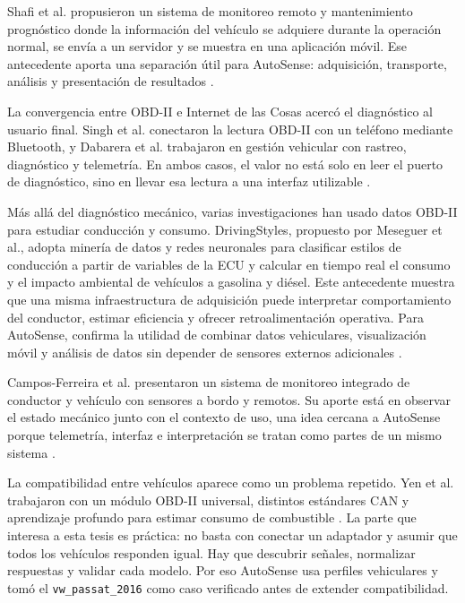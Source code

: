 \documentclass[12pt,letterpaper]{report}
\begin{document}
Shafi et al. propusieron un sistema de monitoreo remoto y mantenimiento prognóstico donde la información del vehículo se adquiere durante la operación normal, se envía a un servidor y se muestra en una aplicación móvil. Ese antecedente aporta una separación útil para AutoSense: adquisición, transporte, análisis y presentación de resultados \cite{shafi2018_vehicle_remote_health}.

La convergencia entre OBD-II e Internet de las Cosas acercó el diagnóstico al usuario final. Singh et al. conectaron la lectura OBD-II con un teléfono mediante Bluetooth, y Dabarera et al. trabajaron en gestión vehicular con rastreo, diagnóstico y telemetría. En ambos casos, el valor no está solo en leer el puerto de diagnóstico, sino en llevar esa lectura a una interfaz utilizable \cite{singh2021_obdii_iot,dabarera2022_iot_vehicle_management}.

Más allá del diagnóstico mecánico, varias investigaciones han usado datos OBD-II para estudiar conducción y consumo. DrivingStyles, propuesto por Meseguer et al., adopta minería de datos y redes neuronales para clasificar estilos de conducción a partir de variables de la ECU y calcular en tiempo real el consumo y el impacto ambiental de vehículos a gasolina y diésel. Este antecedente muestra que una misma infraestructura de adquisición puede interpretar comportamiento del conductor, estimar eficiencia y ofrecer retroalimentación operativa. Para AutoSense, confirma la utilidad de combinar datos vehiculares, visualización móvil y análisis de datos sin depender de sensores externos adicionales \cite{meseguer2017_drivingstyles}.

Campos-Ferreira et al. presentaron un sistema de monitoreo integrado de conductor y vehículo con sensores a bordo y remotos. Su aporte está en observar el estado mecánico junto con el contexto de uso, una idea cercana a AutoSense porque telemetría, interfaz e interpretación se tratan como partes de un mismo sistema \cite{camposferreira2023_vehicle_driver_monitoring}.

La compatibilidad entre vehículos aparece como un problema repetido. Yen et al. trabajaron con un módulo OBD-II universal, distintos estándares CAN y aprendizaje profundo para estimar consumo de combustible \cite{yen2021_universal_obdii}. La parte que interesa a esta tesis es práctica: no basta con conectar un adaptador y asumir que todos los vehículos responden igual. Hay que descubrir señales, normalizar respuestas y validar cada modelo. Por eso AutoSense usa perfiles vehiculares y tomó el \texttt{vw\_passat\_2016} como caso verificado antes de extender compatibilidad.
\end{document}
